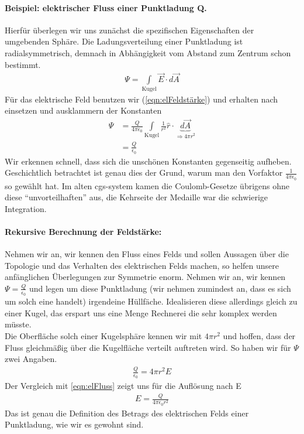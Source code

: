  \paragraph{Beispiel: elektrischer Fluss einer Punktladung Q.} Hierfür überlegen wir uns zunächst die spezifischen Eigenschaften der umgebenden Sphäre. Die Ladungsverteilung einer Punktladung ist radialsymmetrisch, demnach in Abhängigkeit vom Abstand zum Zentrum schon bestimmt.\begin{align*}
\Psi = \int \limits_{\mathrm{Kugel}} \vec{E} \cdot d\vec{A}
\end{align*}Für das elektrische Feld benutzen wir (\ref{eqn:elFeldstärke}) und erhalten nach einsetzen und ausklammern der Konstanten\begin{align*}
\Psi 	&= \frac{Q}{4\pi\epsilon_0}\int \limits_{\mathrm{Kugel}} \frac{1}{r^2}\hat{r} \cdot \underbrace{d\vec{A}}_{\Rightarrow 4\pi r^2}\\
		&= \frac{Q}{\epsilon_0} \label{eqn:elFluss_Punktladung}
\end{align*}Wir erkennen schnell, dass sich die unschönen Konstanten gegenseitig aufheben. Geschichtlich betrachtet ist genau dies der Grund, warum man den Vorfaktor $\tfrac{1}{4\pi\epsilon_0}$ so gewählt hat. Im alten cgs-system kamen die Coulomb-Gesetze übrigens ohne diese "`unvorteilhaften"' aus, die Kehrseite der  Medaille war die schwierige Integration.

\paragraph{Rekursive Berechnung der Feldstärke:} Nehmen wir an, wir kennen den Fluss eines Felds und sollen Aussagen über die Topologie und das Verhalten des elektrischen Felds machen, so helfen unsere anfänglichen Überlegungen zur Symmetrie enorm. Nehmen wir an, wir kennen $\Psi = \frac{Q}{\epsilon_0}$ und legen um diese Punktladung (wir nehmen zumindest an, dass es sich um solch eine handelt) irgendeine Hüllfäche. Idealisieren diese allerdings gleich zu einer Kugel, das erspart uns eine Menge Rechnerei die sehr komplex werden müsste. \\Die Oberfläche solch einer Kugelsphäre kennen wir mit $4\pi r^2$ und hoffen, dass der Fluss gleichmäßig über die Kugelfläche verteilt auftreten wird. So haben wir für $\Psi$ zwei Angaben.\begin{align*}
\frac{Q}{\epsilon_0} = 4\pi r^2 E
\end{align*}Der Vergleich mit \ref{eqn:elFluss} zeigt uns für die Auflösung nach E\begin{align}
E = \frac{Q}{4\pi \epsilon_0 r^2}
\end{align}Das ist genau die Definition des Betrags des elektrischen Felds einer Punktladung, wie wir es gewohnt sind.
